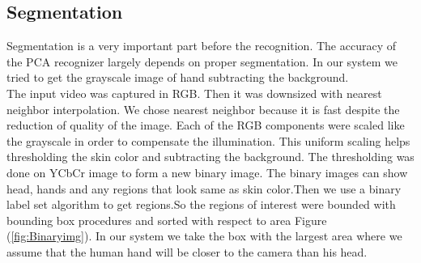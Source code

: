 \documentclass[12pt]{report}
\begin{document}
\subsection*{Segmentation}
Segmentation is a very important part before the recognition. The accuracy of the PCA recognizer largely depends on proper segmentation. In our system we tried to get the grayscale image of hand subtracting the background.\\
The input video was captured in RGB. Then it was downsized with nearest neighbor interpolation. We chose nearest neighbor because it is fast despite the reduction of quality of the image. Each of the RGB components were scaled like the grayscale in order to compensate the illumination. This uniform scaling helps thresholding the skin color and subtracting the background. The thresholding was done on YCbCr image to form a new binary image. The binary images can show head, hands and any regions that look same as skin color.Then we use a binary label set algorithm to get regions.So the regions of interest were bounded with bounding box procedures and sorted with respect to area Figure (\ref{fig:Binaryimg}). In our system we take the box with the largest area where we assume that the human hand will be closer to the camera than his head.\\
\end{document}
